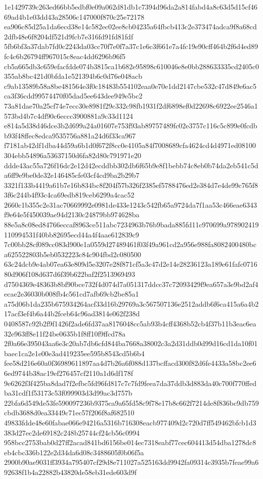 \documentclass[11pt,a4paper]{article}
\begin{document}
{1e1429739c263ed66bb5edbf0e09a062d81db1c7394d96da2a814fabd4a8c63d5d15cf4669ad4b1e03dd43a28506c147000f870c25e72178
ea906c85d25a1da6ecd38e14c582ec02ee8cb04235a64fbcb413c2e373474adca9f8a68cd2dfb48e6f8204df521d9fcb7e316fd91fd81fdf
5fb6bf3a37dab7fd0c2243da03cc70f7e0f7a37c1e6c3f661e7a4fc19e90cff464b2f6d4ed89fc4c6b26794ff967015c8eac4dd6296b96f5
cb5a665db3c659efacfdde074b3815ca1b682e95898c610046e8e0bb288633335cd2405c0355ab8bc421d0bfda1e521394b6c0d76e048acb
c9ab13589b58a8be481564e3f0c18483b554102eaa0e70e1dd2147cbe532c47d849e6ac5ca3f36cdd99574470f05dad5ee643dee949e5bc2
73a81dae70a25cf74e7ecc30e8981f29c332c98fb1931f2df6898ef0d22698c6922ee2546a1573bd4b7c4df90c6eccc3900881a9c33d1124
e814a5d38d46dce3b2d699a24a01607e753f93ab89757489fc02e3757c116c5c899e0fcdbb93f48ffec8edca9535756a881a24d6f33ca967
f7181ab42df1dba44d59a6b1d0f672f8cc0e4105a84f7008689cfa4624cd4d4971ed08100304ebb54896a53637150d6fa82d80c791971e20
ddde43ac55a726f16dc2e12d42ecddbb302db6f65b9e8f1bebb74c8eb0b74da2eb541c5da6ff9e9be0de32e146485cfe03cf4cd9ba2b29b7
3321f133b4419a61b7e16b834bc8f204f57b326f2385ef5788476ed2e384d7e4de99c765f83f6c244b4f93c4ca69edb819ceb6299a4cac52
2660c1b355c2e31ac70669992e0981de433e1243c542fb65a9724da7f1aa53c466eae6343f9e64e5f450039ae94d2130c24879bb974628ba
88e5a8c08ed84766eccaf8963ce511abc7234963b76b9bada885fd11c970699a978902419110994531f40bb82695ecd44a4f4aae612839c9
7c00bb28cf089cc083d900e1a0559d27489461f03f49a961cd2a956e988fa8082400480bca625522803b5eb0532223c84c904fbd2c080500
63c24dcb9e4ab07ea63e809d5e3207e28f871cf5a3c47d2e14e28236123a189e61fafc071680d906f108d637d6f39b622baf2f2513969493
d7504369e48363b8bf90bce732f4d074d7a051317ddcc37c72093429f9ea657a3e9bd2af4ecae2e36030b008fb4c561cd7afb69cb2be85a1
a75d06b1da235b675934264acf33d16b29769a3c567507136e2512addb6f6ca415a6a4b217acf3ef4b6a44b2fceb64c96ad3814e062f238d
0408587c92b2f9f1426f2ade6fd37aa8176048cc5ab93b4cff4368b52cb4f37b11b3eac6ea32e963ff8e11f24be0635b1f8ff10f9ffcd78a
2f0a66e395043aa6e3c20ab7db6cfd844ba7668a38002c3a2d31ddb0d99d16cd1da10f01baec1ca2e1e00e3ad419235ee595b8543cd5b6b4
fee58d216e60a0f36989611897aa4d7b26a6f088d137bcffacd300f82d6fe4433a58bc2ee66ed9744b38ac19ef276457cf2110a1d6df178f
9e6262f3f425ba8dad7f2efbc5fd96fd817c7c7fd9feea7da37ddb3d883da40c700f770ffedba31cdf1f53173c53f099903d3d99ac3d757b
22bfa6d549de53fe590097236b9375ca9a65fd58c9f78e17b8c662f7214de8f836bc9db759cbdb3688d0ea33449c71ec57f206f8af682510
49833fdde48e60fabae066e94216a5316b716308eacb977409d2c720d7ff549462bfcb1d3383d27ec2de69182c248b25744cf24cb56c0994
958bcc2753bab0d27ff2acad841bd6156be014ec7318eabf77cec604413d54dba1278dc8eb4cbc336b122e2d34da6d08c3488605f0b06f5a
2900b90ae9031ff3934a795407cf29d8e711027a525163dd9942fa09314c3935b7feae99a692638f1b4a22882b43820de58eb31ede603d9f
}
\end{document}
